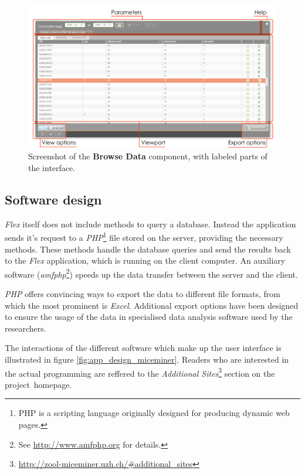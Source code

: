 \begin{figure}[!htbp]
\begin{center}
  \includegraphics[width=.75\textwidth]{assets/pdf/interface_component.pdf}
  \caption[Browse Data component interface]{Screenshot of the \textbf{Browse Data} component, with labeled parts of the interface.}
  \label{fig:interface_component}
\end{center}
\end{figure}

\subsection{Software design}
\label{subsec:miceminer_design}   

\textit{Flex} itself does not include methods to query a database. Instead the application sends it's request to a \textit{PHP}\footnote{PHP is a scripting language originally designed for producing dynamic web pages\cite{wiki:php}.} file stored on the server, providing the necessary methods. These methods handle the database queries and send the results back to the \textit{Flex} application, which is running on the client computer. An auxiliary software (\textit{amfphp}\footnote{See \href{http://www.amfphp.org}{http://www.amfphp.org} for details.}) speeds up the data transfer between the server and the client.

\textit{PHP} offers convincing ways to export the data to different file formats, from which the most prominent is \textit{Excel}. Additional export options have been designed to ensure the usage of the data in specialised data analysis software used by the researchers.

The interactions of the different software which make up the user interface is illustrated in figure \ref{fig:app_design_miceminer}. Readers who are interested in the actual programming are reffered to the \textit{Additional Sites}\footnote{\href{http://zool-miceminer.uzh.ch/\#additional_sites}{http://zool-miceminer.uzh.ch/\#additional\_sites}} section on the project~homepage.   

